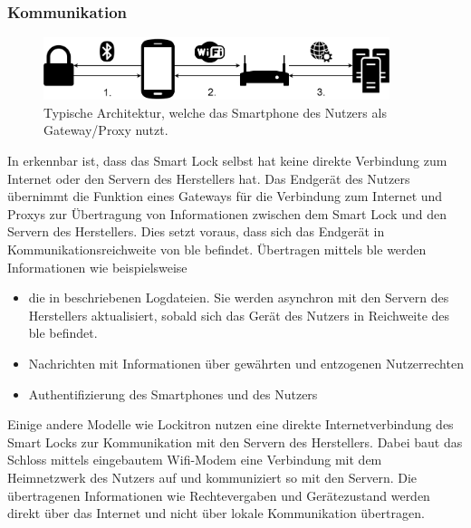 	\subsubsection{Kommunikation}
	\label{sec:sota_smart_locks_comm}
	    \begin{figure}[H]
    		\centering
    		\includegraphics[width=0.9\textwidth]{graphics/gateway_arch.png}
    		\caption[Typische Architektur eines Smart Locks]{Typische Architektur, welche das Smartphone des Nutzers als Gateway/Proxy nutzt\cite{Ho2016}.}
    		\label{fig:gateway_arch}
    	\end{figure}
        In  erkennbar ist, dass das Smart Lock selbst hat keine direkte Verbindung zum Internet oder den Servern des Herstellers hat. 
        Das Endgerät des Nutzers übernimmt die Funktion eines Gateways für die Verbindung zum Internet und Proxys zur Übertragung von Informationen zwischen dem Smart Lock und den Servern des Herstellers. 
        Dies setzt voraus, dass sich das Endgerät in Kommunikationsreichweite von \gls{ble} befindet. \cite{Ho2016}
        \newpage
        Übertragen mittels \gls{ble} werden Informationen wie beispielsweise
        \begin{itemize}[noitemsep]
            \item die in  beschriebenen Logdateien.
                Sie werden asynchron mit den Servern des Herstellers aktualisiert, sobald sich das Gerät des Nutzers in Reichweite des \gls{ble} befindet.
            \item Nachrichten mit Informationen über gewährten und entzogenen Nutzerrechten
            \item Authentifizierung des Smartphones und des Nutzers 
        \end{itemize}
        
        \noindent Einige andere Modelle wie Lockitron\cite{lockitron} nutzen eine direkte Internetverbindung des Smart Locks zur Kommunikation mit den Servern des Herstellers. 
        Dabei baut das Schloss mittels eingebautem Wifi-Modem eine Verbindung mit dem Heimnetzwerk des Nutzers auf und kommuniziert so mit den Servern. 
        Die übertragenen Informationen wie Rechtevergaben und Gerätezustand werden direkt über das Internet und nicht über lokale Kommunikation übertragen. 

